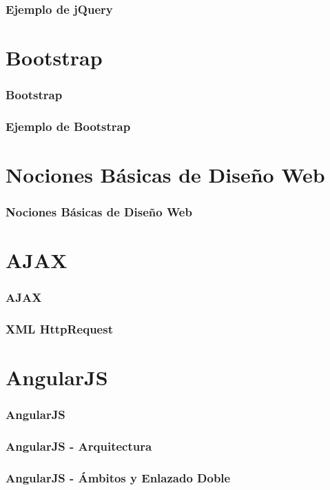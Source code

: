 \documentclass[a4paper,slidestop,xcolor=pst,blue]{beamer}
\begin{document}
\begin{frame}[c]
    \frametitle{Ejemplo de jQuery}
\end{frame}

\section{Bootstrap}

\begin{frame}[c]
    \frametitle{Bootstrap}
\end{frame}

\begin{frame}[c]
    \frametitle{Ejemplo de Bootstrap}
\end{frame}

\section{Nociones Básicas de Diseño Web}

\begin{frame}[c]
    \frametitle{Nociones Básicas de Diseño Web}
\end{frame}

\section{AJAX}

\begin{frame}[c]
    \frametitle{AJAX}
\end{frame}

\begin{frame}[c]
    \frametitle{XML HttpRequest}
\end{frame}

\section{AngularJS}

\begin{frame}[c]
    \frametitle{AngularJS}
\end{frame}

\begin{frame}[c]
    \frametitle{AngularJS - Arquitectura}
\end{frame}

\begin{frame}[c]
    \frametitle{AngularJS - Ámbitos y Enlazado Doble}
\end{frame}
\end{document}
